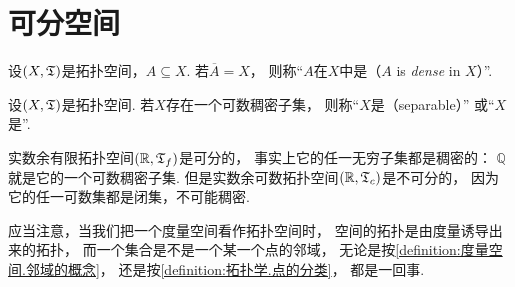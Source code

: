 \section{可分空间}
\begin{definition}
设\((X,\mathfrak T)\)是拓扑空间，\(A \subseteq X\).
若\(\overline{A}=X\)，
则称“\(A\)在\(X\)中是（\(A\) is \emph{dense} in \(X\)）”.
\end{definition}

\begin{definition}
设\((X,\mathfrak T)\)是拓扑空间.
若\(X\)存在一个可数稠密子集，
则称“\(X\)是（separable）”
或“\(X\)是”.
\end{definition}

\begin{example}
实数余有限拓扑空间\((\mathbb{R},\mathfrak T_f)\)是可分的，
事实上它的任一无穷子集都是稠密的：
\(\mathbb{Q}\)就是它的一个可数稠密子集.
但是实数余可数拓扑空间\((\mathbb{R},\mathfrak T_c)\)是不可分的，
因为它的任一可数集都是闭集，不可能稠密.
\end{example}

\begin{remark}
应当注意，当我们把一个度量空间看作拓扑空间时，
空间的拓扑是由度量诱导出来的拓扑，
而一个集合是不是一个某一个点的邻域，
无论是按\cref{definition:度量空间.邻域的概念}，
还是按\cref{definition:拓扑学.点的分类}，
都是一回事.
\end{remark}
